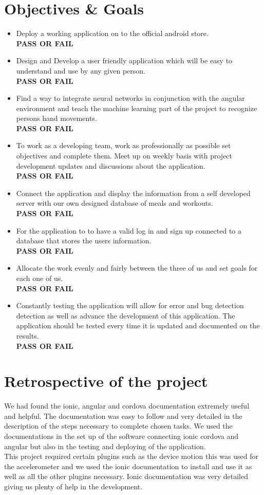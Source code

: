 \documentclass[a4paper,12pt]{report}
\begin{document}
\section{Objectives \& Goals}
\begin{itemize}

\item Deploy a working application on to the official android store.\\
\textbf{PASS OR FAIL}
\item Design and Develop a user friendly application which will be easy to understand and use by any given person.\\
\textbf{PASS OR FAIL}
\item Find a way to integrate neural networks in conjunction with the angular environment and teach the machine learning part of the project to recognize persons hand movements.\\
\textbf{PASS OR FAIL}
\newpage
\item To work as a developing team, work as professionally as possible set objectives and complete them. Meet up on weekly basis with project development updates and discussions about the application.\\
\textbf{PASS OR FAIL} 
\item Connect the application and display the information from a self developed server with our own designed database of meals and workouts.\\
\textbf{PASS OR FAIL}
\item For the application to to have a valid log in and sign up connected to a database that stores the users information.\\
\textbf{PASS OR FAIL}
\item Allocate the work evenly and fairly between the three of us and set goals for each one of us.\\
\textbf{PASS OR FAIL}
\item Constantly testing the application will allow for error and bug detection detection as well as advance the development of this application. The application should be tested every time it is updated and documented on the results.\\
\textbf{PASS OR FAIL}  
\end{itemize}
\newpage
\section{Retrospective of the project}

We had found the ionic, angular and cordova documentation extremely useful and helpful. 
The documentation was easy to follow and very detailed in the description of the steps necessary to complete chosen tasks.
We used the documentations in the set up of the software connecting ionic cordova and angular but also in the testing and deploying of the application.\\
This project required certain plugins such as the device motion this was used for the accelerometer and we used the ionic documentation to install and use it as well as all the other plugins necessary.
Ionic documentation was very detailed giving us plenty of help in the development.
\end{document}

